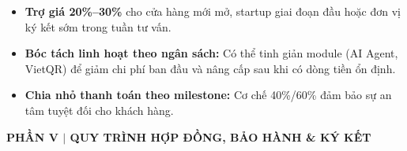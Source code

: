 \documentclass[11pt,a4paper]{article}
\newcommand{\sectionbanner}[2]{%
  \vspace{1mm}%
  \begin{tcolorbox}[colback=primary,colframe=primary,arc=1.5mm,boxrule=0pt,top=2mm,bottom=2mm,left=3mm,right=3mm]
    {\large\bfseries\color{white} #1 \quad$\vert$\quad \normalsize\color{white} #2}
  \end{tcolorbox}%
  \vspace{1mm}%
}
\begin{document}
\vspace{2mm}
\begin{tcolorbox}[colback=softbg,colframe=primary,colbacktitle=primary,coltitle=white,arc=2mm,boxrule=0.8pt,top=1.5mm,bottom=1.5mm,title=\textbf{CHÍNH SÁCH ĐÀM PHÁN NGÂN SÁCH \& TRỢ GIÁ KHỞI NGHIỆP}]
\small
\begin{itemize}[leftmargin=*,itemsep=1.5pt,topsep=0pt]
    \item \textbf{Trợ giá 20\%--30\%} cho cửa hàng mới mở, startup giai đoạn đầu hoặc đơn vị ký kết sớm trong tuần tư vấn.
    \item \textbf{Bóc tách linh hoạt theo ngân sách:} Có thể tinh giản module (AI Agent, VietQR) để giảm chi phí ban đầu và nâng cấp sau khi có dòng tiền ổn định.
    \item \textbf{Chia nhỏ thanh toán theo milestone:} Cơ chế 40\%/60\% đảm bảo sự an tâm tuyệt đối cho khách hàng.
\end{itemize}
\end{tcolorbox}

\newpage

\sectionbanner{PHẦN V}{QUY TRÌNH HỢP ĐỒNG, BẢO HÀNH \& KÝ KẾT}
\end{document}
